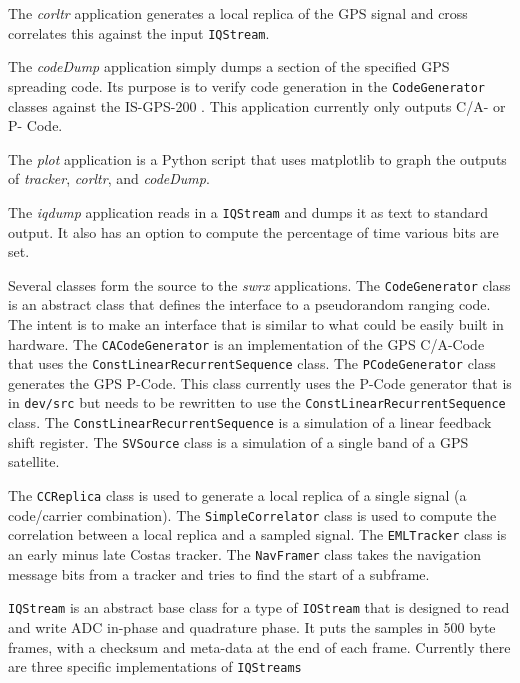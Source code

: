 \documentclass[letterpaper,ugly,10pt]{ion-gps}
\newcommand{\gpstkapp}[1]{\textit{\mbox{#1}}}
\newcommand{\gpstkdir}[1]{\texttt{\mbox{#1}}}
\newcommand{\gpstkclass}[1]{\texttt{\mbox{#1}}}
\begin{document}
The \gpstkapp{corltr} application generates a local replica of the GPS signal and cross correlates this against the input \gpstkclass{IQStream}.

The \gpstkapp{codeDump} application simply dumps a section of the specified GPS spreading code. Its purpose is to verify code generation in the \gpstkclass{CodeGenerator} classes against the IS-GPS-200 \cite{isgps200}. This application currently only outputs C/A- or P- Code.

The \gpstkapp{plot} application is a Python script that uses matplotlib to graph the outputs of \gpstkapp{tracker}, \gpstkapp{corltr}, and \gpstkapp{codeDump}.

The \gpstkapp{iqdump} application reads in a \gpstkclass{IQStream} and dumps it as text to standard output. It also has an option to compute the percentage of time various bits are set.

Several classes form the source to the \gpstkapp{swrx} applications. The \gpstkclass{CodeGenerator} class is an abstract class that defines the interface to a pseudorandom ranging code. The intent is to make an interface that is similar to what could be easily built in hardware. The \gpstkclass{CACodeGenerator} is an implementation of the GPS C/A-Code that uses the \gpstkclass{ConstLinearRecurrentSequence} class. The \gpstkclass{PCodeGenerator} class generates the GPS P-Code. This class currently uses the P-Code generator that is in \gpstkdir{dev/src} but needs to be rewritten to use the \gpstkclass{ConstLinearRecurrentSequence} class. The \gpstkclass{ConstLinearRecurrentSequence} is a simulation of a linear feedback shift register. The \gpstkclass{SVSource} class is a simulation of a single band of a GPS satellite. 

The \gpstkclass{CCReplica} class is used to generate a local replica of a single signal (a code/carrier combination). The \gpstkclass{SimpleCorrelator} class is used to  compute the correlation between a local replica and a sampled signal. The \gpstkclass{EMLTracker} class is an early minus late Costas tracker. The  \gpstkclass{NavFramer} class takes the navigation message bits from a tracker and tries to find the start of a subframe.

\gpstkclass{IQStream} is an abstract  base class for a type of \gpstkclass{IOStream} that is designed to read and write ADC in-phase and quadrature phase. It puts the samples in 500 byte frames, with a checksum and meta-data at the end of each frame. Currently there are three specific implementations of \gpstkclass{IQStreams}
\end{document}
